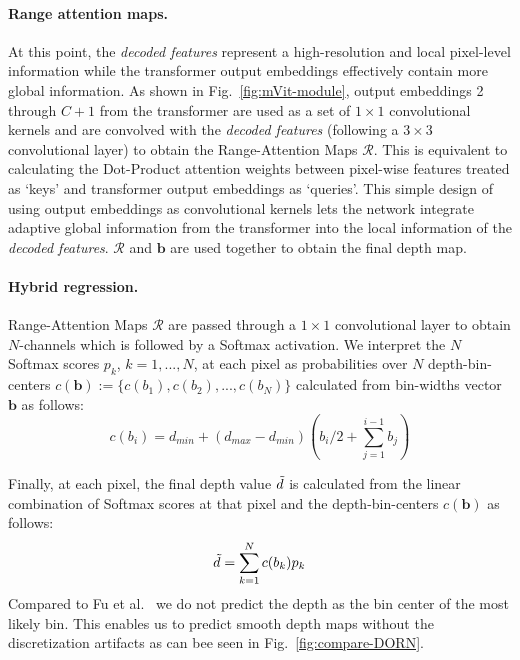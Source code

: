 \documentclass[final]{cvpr}
\begin{document}
\paragraph{Range attention maps.} At this point, the \textit{decoded features} represent a high-resolution and local pixel-level information while the transformer output embeddings effectively contain more global information. As shown in Fig.~\ref{fig:mVit-module}, output embeddings 2 through $C+1$ from the transformer are used as a set of $1\times 1$ convolutional kernels and are convolved with the \textit{decoded features} (following a $3\times 3$ convolutional layer) to obtain the Range-Attention Maps $\mathcal{R}$. This is equivalent to calculating the Dot-Product attention weights between pixel-wise features treated as `keys' and transformer output embeddings as `queries'. This simple design of using output embeddings as convolutional kernels lets the network integrate adaptive global information from the transformer into the local information of the \textit{decoded features}. $\mathcal{R}$ and $\textbf{b}$ are used together to obtain the final depth map.

\paragraph{Hybrid regression.} Range-Attention Maps $\mathcal{R}$ are passed through a $1\times 1$ convolutional layer to obtain $N$-channels which is followed by a Softmax activation. We interpret the $N$ Softmax scores $p_k$, $k=1,...,N$, at each pixel as probabilities over $N$ depth-bin-centers $c(\textbf{b}) := \{c(b_1), c(b_2), ..., c(b_N)\}$
calculated from bin-widths vector $\textbf{b}$ as follows:
%
\begin{equation}
    c(b_i) =  d_{min} + (d_{max} - d_{min})(b_i/2 + \sum_{j=1}^{i-1} b_j)
\end{equation}

Finally, at each pixel, the final depth value $\Tilde{d}$ is calculated from the linear combination of Softmax scores at that pixel and the depth-bin-centers $c(\textbf{b})$ as follows:
\begin{equation}
    \Tilde{d} = \sum_{k=1}^N c(b_k) p_k
\end{equation}
Compared to Fu et al.~\cite{Fu2018DeepOR} we do not predict the depth as the bin center of the most likely bin. This enables us to predict smooth depth maps without the discretization artifacts as can bee seen in Fig.~\ref{fig:compare-DORN}.
\end{document}
